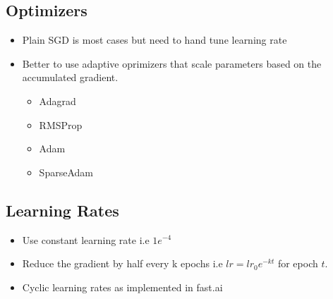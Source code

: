 \documentclass[a4paper]{article}
\begin{document}
\subsection{Optimizers}
\begin{itemize}
    \item Plain SGD is most cases but need to hand tune learning rate
    \item Better to use adaptive oprimizers that scale parameters based on the accumulated gradient.
    \begin{itemize}
        \item Adagrad
        \item RMSProp
        \item Adam
        \item SparseAdam
    \end{itemize}
\end{itemize}
\subsection{Learning Rates}
\begin{itemize}
    \item Use constant learning rate i.e $1e^{-4}$
    \item Reduce the gradient by half every k epochs i.e $lr = lr_0e^{-kt}$ for epoch  $t$.
    \item Cyclic learning rates as implemented in fast.ai
\end{itemize}
\end{document}
